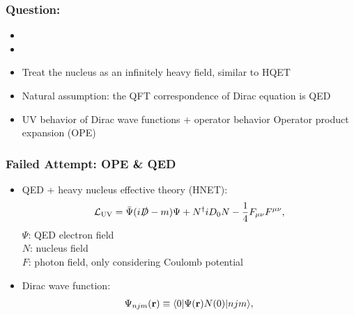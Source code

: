 \begin{frame}
	\frametitle{Question: }
	\large
	\begin{itemize}
		\item {}
		\item {}
		\item Treat the nucleus as an infinitely heavy field, similar to HQET
		\item Natural assumption: the QFT correspondence of Dirac equation is QED
		\item UV behavior of Dirac wave functions + operator behavior 
		\Rightarrow Operator product expansion (OPE)
	\end{itemize}

\end{frame}

\begin{frame}
	\frametitle{Failed Attempt: OPE \& QED}

	
	\begin{itemize}
		\item QED + heavy nucleus effective theory (HNET): 
		\begin{align}
			{\mathcal L}_{\rm UV} = \bar{\Psi}(i\slashed{D}-m)\Psi +N^\dagger iD_0 N-\frac{1}{4}F_{\mu\nu}F^{\mu\nu},
			\label{UV:atom:lagrangian}
		\end{align}
		$\Psi$: QED electron field\\
		$N$: nucleus field\\
		$F$: photon field, only considering Coulomb potential
		\item Dirac wave function: 
			\begin{align}
				\Psi_{njm}({\bf r}) \equiv \langle 0 \vert  \Psi({\bf r}) N(0) \vert n j m \rangle,
				\label{Dirac:wf:nonlocal:matrix:element}
			\end{align}
	\end{itemize}


\end{frame}

